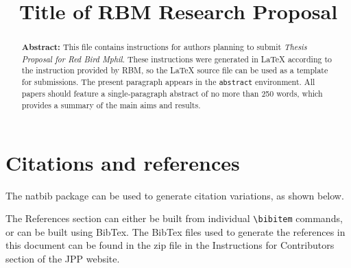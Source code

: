 \documentclass[12pt]{Style/RBM_P}
\title{Title of RBM Research Proposal}
\begin{document}


\maketitle


\begin{abstract}
\textbf{Abstract: } This file contains instructions for authors planning to submit \textit{Thesis Proposal for Red Bird Mphil}. These instructions were generated in {\LaTeX} according to the instruction provided by RBM, so the {\LaTeX} source file can be used as a template for submissions. The present paragraph appears in the \verb|abstract| environment. All papers should feature a single-paragraph abstract of no more than 250 words, which provides a summary of the main aims and results.
\end{abstract}



\section{Citations and references}

The natbib package can be used to generate citation variations, as shown below. \cite{ngFederatedBayesianNetwork2022}


The References section can either be built from individual \verb#\bibitem# commands, or can be built using BibTex. The BibTex files used to generate the references in this document can be found in the zip file in the Instructions for Contributors section of the JPP website.
\end{document}
